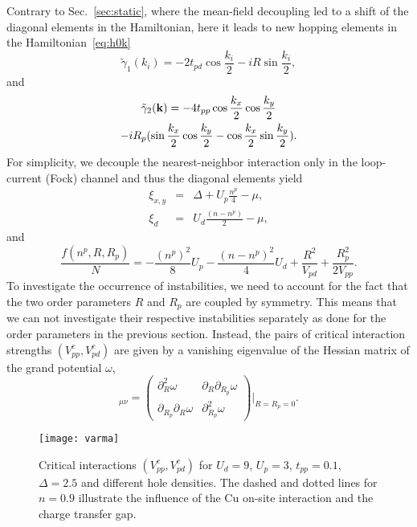 \documentclass[prb, twocolumn,showpacs,preprintnumbers,amsmath,amssymb, floatfix]{revtex4}
\begin{document}
Contrary to Sec.~\ref{sec:static}, where the mean-field decoupling led to a shift of the diagonal elements in the Hamiltonian, here it leads to new hopping elements in the Hamiltonian~\eqref{eq:h0k}
\begin{equation}
  \tilde{\gamma}_1(k_i) = -2t_{pd}\cos\frac{k_i}2 - i R \sin\frac{k_i}2,
  \label{eq:currentgamma1}
\end{equation}
and
\begin{multline}
  \tilde{\gamma}_2({\bf k}) = -4 t_{pp} \cos\frac{k_x}2\cos\frac{k_y}2\\
  - i R_p (\sin\frac{k_x}2\cos\frac{k_y}2 - \cos\frac{k_x}2\sin\frac{k_y}2).
  \label{eq:currentgamma2}
\end{multline}
For simplicity, we decouple the nearest-neighbor interaction only in the loop-current (Fock) channel and thus the diagonal elements yield
\begin{eqnarray}
  \xi_{x,y} &=& \Delta + U_{p} \frac{n^{p}}{4} - \mu,\\
  \xi_{d} &=& U_{d} \frac{(n-n^p)}{2} - \mu,
  \label{eqn:currentdiag}
\end{eqnarray}
and
\begin{equation}
  \frac{f(n^{p},R, R_p)}{N} = - \frac{(n^p)^2}8 U_p - \frac{(n-n^p)^2}4 U_d + \frac{R^2}{V_{pd}} + \frac{R_p^2}{2 V_{pp}}.
  \label{eq:currentfN}
\end{equation}
To investigate the occurrence of instabilities, we need to account for the fact that the two order parameters $R$ and $R_p$ are coupled by symmetry. This means that we can not investigate their respective instabilities separately as done for the order parameters in the previous section. Instead, the pairs of critical interaction strengths $(V_{pp}^c, V_{pd}^c)$ are given by a vanishing eigenvalue of the Hessian matrix of the grand potential $\omega$,
\begin{equation}
  [\omega]_{\mu\nu} = \left(\begin{array}{cc}\partial_{R}^2\omega & \partial_{R}\partial_{R_p}\omega \\ \partial_{R_p}\partial_{R}\omega & \partial_{R_p}^2\omega\end{array}\right)\Big|_{R=R_p=0}.
  \label{eq:hessian}
\end{equation}

\begin{figure}[tb]
  \begin{center}
    \texttt{[image: varma]}
  \end{center}
  \caption{Critical interactions $(V_{pp}^c, V_{pd}^c)$ for $U_d = 9$, $U_p = 3$, $t_{pp} = 0.1$, $\Delta = 2.5$ and different hole densities. The dashed and dotted lines for $n=0.9$ illustrate the influence of the Cu on-site interaction and the charge transfer gap.}
  \label{fig:varma}
\end{figure}
\end{document}
